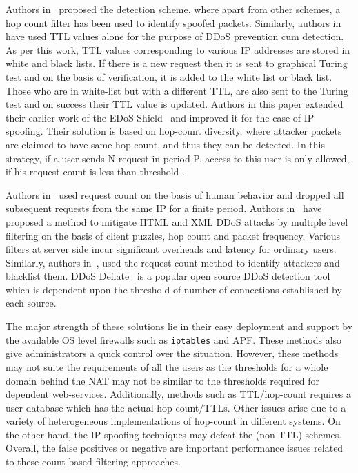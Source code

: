 \documentclass[final,5p,times,twocolumn]{elsarticle}
\begin{document}
Authors in~\cite{comber} proposed the detection scheme, where apart from other schemes, a hop count filter has been used to identify spoofed packets. Similarly, authors in ~\cite{enhanced} have used TTL values alone for the purpose of DDoS prevention cum detection. As per this work, TTL values corresponding to various IP addresses are stored in white and black lists. If there is a new request then it is sent to graphical Turing test and on the basis of verification, it is added to the white list or black list. Those who are in white-list but with a different TTL, are also sent to the Turing test and on success their TTL value is updated. Authors in this paper extended their earlier work of the EDoS Shield~\cite{edosshield} and improved it for the case of IP spoofing. Their solution is based on hop-count diversity, where attacker packets are claimed to have same hop count, and thus they can be detected. In this strategy, if a user sends N request in period P, access to this user is only allowed, if his request count is less than threshold . 

Authors in~\cite{index} used request count on the basis of human behavior and dropped all subsequent requests from the same IP for a finite period. Authors in~\cite{comber} have proposed a method to mitigate HTML and XML DDoS attacks by multiple level filtering on the basis of client puzzles, hop count and packet frequency. Various filters at server side incur significant overheads and latency for ordinary users. Similarly, authors in~\cite{army}, used the request count method to identify attackers and blacklist them. {DDoS Deflate~\cite{deflate} is a popular open source DDoS detection tool which is dependent upon the threshold of number of connections established by each source.} 

{The major strength of these solutions lie in their easy deployment and support by the available OS level firewalls such as \texttt{iptables} and APF. These methods also give administrators a quick control over the situation. }{However, these methods may not suite the requirements of all the users as the thresholds for a whole domain behind the NAT may not be similar to the thresholds required for dependent web-services. Additionally, methods such as TTL/hop-count requires a user database which has the actual hop-count/TTLs. Other issues arise due to a variety of heterogeneous implementations of hop-count in different systems. On the other hand, the IP spoofing techniques may defeat  the (non-TTL) schemes. Overall, the false positives or negative are important performance issues related to these count based filtering approaches.}
\end{document}
